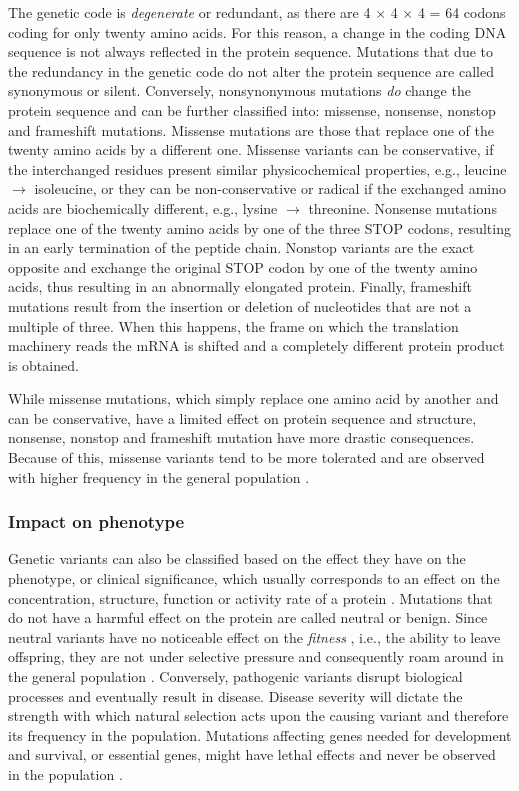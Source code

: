 The genetic code is \textit{degenerate} or redundant, as there are 4 $\times$ 4 $\times$ 4 = 64 codons coding for only twenty amino acids. For this reason, a change in the coding DNA sequence is not always reflected in the protein sequence. Mutations that due to the redundancy in the genetic code do not alter the protein sequence are called synonymous or silent. Conversely, nonsynonymous mutations \textit{do} change the protein sequence and can be further classified into: missense, nonsense, nonstop and frameshift mutations. Missense mutations are those that replace one of the twenty amino acids by a different one. Missense variants can be conservative, if the interchanged residues present similar physicochemical properties, e.g., leucine $\rightarrow$ isoleucine, or they can be non-conservative or radical if the exchanged amino acids are biochemically different, e.g., lysine $\rightarrow$ threonine. Nonsense mutations replace one of the twenty amino acids by one of the three STOP codons, resulting in an early termination of the peptide chain. Nonstop variants are the exact opposite and exchange the original STOP codon by one of the twenty amino acids, thus resulting in an abnormally elongated protein. Finally, frameshift mutations result from the insertion or deletion of nucleotides that are not a multiple of three. When this happens, the frame on which the translation machinery reads the mRNA is shifted and a completely different protein product is obtained.

While missense mutations, which simply replace one amino acid by another and can be conservative, have a limited effect on protein sequence and structure, nonsense, nonstop and frameshift mutation have more drastic consequences. Because of this, missense variants tend to be more tolerated and are observed with higher frequency in the general population \cite{COULTER_2004_MUTATIONS}.

\subsubsection{Impact on phenotype}

Genetic variants can also be classified based on the effect they have on the phenotype, or clinical significance, which usually corresponds to an effect on the concentration, structure, function or activity rate of a protein \cite{VIHINEN_2022_VARIATION}. Mutations that do not have a harmful effect on the protein are called neutral or benign. Since neutral variants have no noticeable effect on the \textit{fitness} \cite{DARWIN_1859_ORIGIN}, i.e., the ability to leave offspring, they are not under selective pressure and consequently roam around in the general population \cite{KIMURA_1968_NEUTRAL}. Conversely, pathogenic variants disrupt biological processes and eventually result in disease. Disease severity will dictate the strength with which natural selection acts upon the causing variant and therefore its frequency in the population. Mutations affecting genes needed for development and survival, or essential genes, might have lethal effects and never be observed in the population \cite{GLUECKSOHN_1963_LETHALITY}.

